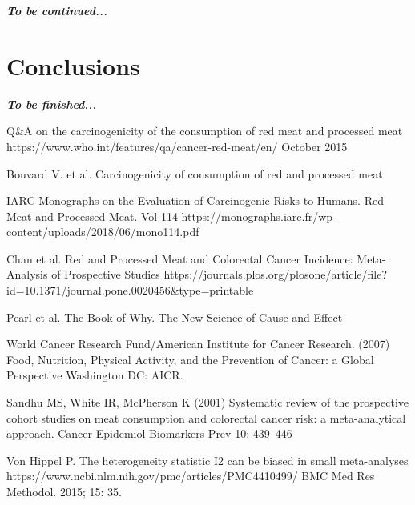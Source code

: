 \documentclass{article}
\begin{document}
\textbf{\textit{To be continued...}}

\section{Conclusions}

\textbf{\textit{To be finished...}}





\begin{thebibliography}{1}

\newblock Q\&A on the carcinogenicity of the consumption of red meat and processed meat
\newblock https://www.who.int/features/qa/cancer-red-meat/en/
\newblock October 2015

Bouvard V. et al.
\newblock Carcinogenicity of consumption of red and processed meat

IARC Monographs on the Evaluation of Carcinogenic Risks to Humans. Red Meat and Processed Meat. Vol 114
https://monographs.iarc.fr/wp-content/uploads/2018/06/mono114.pdf

Chan et al.
\newblock Red and Processed Meat and Colorectal Cancer Incidence: Meta-Analysis of Prospective Studies
https://journals.plos.org/plosone/article/file?id=10.1371/journal.pone.0020456\&type=printable

Pearl et al.
\newblock The Book of Why. The New Science of Cause and Effect

World Cancer Research Fund/American Institute for Cancer Research. (2007)
Food, Nutrition, Physical Activity, and the Prevention of Cancer: a Global
Perspective Washington DC: AICR.

Sandhu MS, White IR, McPherson K (2001) Systematic review of the
prospective cohort studies on meat consumption and colorectal cancer risk: a
meta-analytical approach. Cancer Epidemiol Biomarkers Prev 10: 439–446

Von Hippel P.
The heterogeneity statistic I2 can be biased in small meta-analyses
https://www.ncbi.nlm.nih.gov/pmc/articles/PMC4410499/
BMC Med Res Methodol. 2015; 15: 35.


\end{thebibliography}
\end{document}
